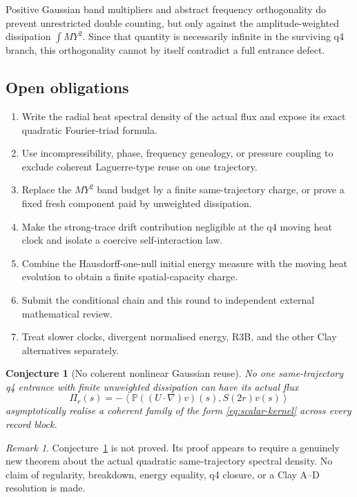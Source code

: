 \documentclass[11pt]{article}
\newtheorem{conjecture}[theorem]{Conjecture}
\theoremstyle{remark}
\newtheorem{remark}[theorem]{Remark}
\newcommand{\Pp}{\mathbb P}
\newcommand{\ip}[2]{\left\langle #1,#2\right\rangle}
\begin{document}
Positive Gaussian band multipliers and abstract frequency orthogonality
do prevent unrestricted double counting, but only against the
amplitude-weighted dissipation \(\int MY^2\).  Since that quantity is
necessarily infinite in the surviving q4 branch, this orthogonality
cannot by itself contradict a full entrance defect.

\subsection*{Open obligations}

\begin{enumerate}
 \item Write the radial heat spectral density of the actual flux and
 expose its exact quadratic Fourier-triad formula.
 \item Use incompressibility, phase, frequency genealogy, or pressure
 coupling to exclude coherent Laguerre-type reuse on one trajectory.
 \item Replace the \(MY^2\) band budget by a finite same-trajectory
 charge, or prove a fixed fresh component paid by unweighted
 dissipation.
 \item Make the strong-trace drift contribution negligible at the q4
 moving heat clock and isolate a coercive self-interaction law.
 \item Combine the Hausdorff-one-null initial energy measure with the
 moving heat evolution to obtain a finite spatial-capacity charge.
 \item Submit the conditional chain and this round to independent
 external mathematical review.
 \item Treat slower clocks, divergent normalised energy, R3B, and the
 other Clay alternatives separately.
\end{enumerate}

\begin{conjecture}[No coherent nonlinear Gaussian reuse]
\label{conj:nonreuse}
No one same-trajectory q4 entrance with finite unweighted dissipation can
have its actual flux
\[
 \Pi_r(s)
 =
 -\ip{\Pp((U\cdot\nabla)v)(s)}{S(2r)v(s)}
\]
asymptotically realise a coherent family of the form
\eqref{eq:scalar-kernel} across every record block.
\end{conjecture}

\begin{remark}
Conjecture~\ref{conj:nonreuse} is not proved.  Its proof appears to
require a genuinely new theorem about the actual quadratic
same-trajectory spectral density.  No claim of regularity, breakdown,
energy equality, q4 closure, or a Clay A--D resolution is made.
\end{remark}
\end{document}
